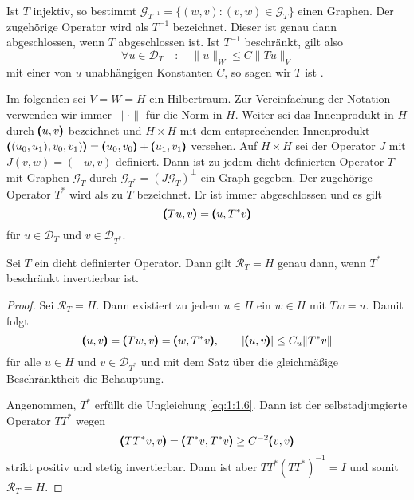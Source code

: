 Ist $T$ injektiv, so bestimmt $\mathcal G_{T^{-1}} = \{ (w,v) : (v,w)\in\mathcal G_T\}$ einen Graphen. Der zugehörige Operator wird als $T^{-1}$ bezeichnet. Dieser ist genau dann abgeschlossen, wenn $T$ abgeschlossen ist. Ist $T^{-1}$ beschränkt, gilt also
\begin{equation}\label{eq:1:1.6} 
   \forall u\in\mathcal D_T \quad:\quad \|u\|_W\le C \|Tu\|_V
\end{equation}
mit einer von $u$ unabhängigen Konstanten $C$, so sagen wir $T$ ist .

Im folgenden sei $V=W=H$ ein Hilbertraum. Zur Vereinfachung der Notation verwenden wir immer $\|\cdot\|$ f\"ur die Norm in $H$. Weiter sei das Innenprodukt in $H$ durch $\pmb(u,v\pmb)$ bezeichnet und $H\times H$ mit dem entsprechenden Innenprodukt $\pmb((u_0,u_1),v_0,v_1)\pmb) = \pmb(u_0,v_0\pmb) + \pmb(u_1,v_1\pmb)$ versehen. Auf $H\times H$ sei der Operator $J$ mit $J(v,w) = (-w,v)$ definiert. Dann ist zu jedem dicht definierten Operator $T$ mit Graphen $\mathcal G_T$ durch $\mathcal G_{T^*}=(J\mathcal G_T)^\perp$ ein Graph gegeben. Der zugeh\"orige Operator $T^*$ wird als zu $T$  bezeichnet. Er ist immer abgeschlossen und es gilt
\begin{equation}
   \pmb(Tu,v\pmb) = \pmb(u,T^*v\pmb)
\end{equation}
f\"ur $u\in\mathcal D_T$ und $v\in\mathcal D_{T^*}$.

\begin{thm}\label{thm:1:1.2}
Sei $T$ ein dicht definierter Operator. Dann gilt $\mathcal R_T=H$ genau dann, wenn 
$T^*$ beschränkt invertierbar ist.
\end{thm}
\begin{proof}
Sei $\mathcal R_T=H$. Dann existiert zu jedem $u\in H$ ein $w\in H$ mit $Tw=u$. Damit folgt
\begin{equation}
   \pmb(u,v\pmb) = \pmb(Tw,v\pmb) = \pmb(w,T^*v\pmb), \qquad |\pmb(u,v\pmb)| \le C_u \|T^*v\|
\end{equation}
f\"ur alle $u\in H$ und $v\in\mathcal D_{T^*}$ und mit dem Satz über die gleichmäßige Beschränktheit die Behauptung.

Angenommen, $T^*$ erf\"ullt die Ungleichung \eqref{eq:1:1.6}. Dann ist der selbstadjungierte Operator $TT^*$ wegen
\begin{equation}
  \pmb(TT^*v,v\pmb) = \pmb(T^*v,T^*v\pmb) \ge C^{-2} \pmb(v,v\pmb)
\end{equation}
strikt positiv und stetig invertierbar. Dann ist aber $TT^* (TT^*)^{-1}  = I$ und somit $\mathcal R_T = H$.
\end{proof}

